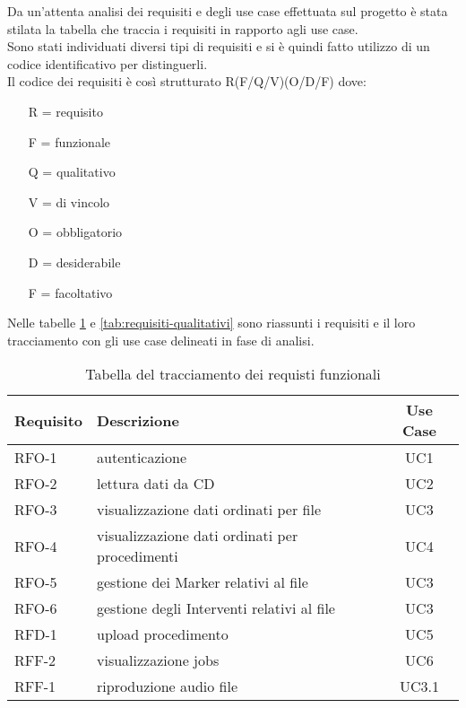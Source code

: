 Da un'attenta analisi dei requisiti e degli use case effettuata sul progetto è stata stilata la tabella che traccia i requisiti in rapporto agli use case.\\
Sono stati individuati diversi tipi di requisiti e si è quindi fatto utilizzo di un codice identificativo per distinguerli.\\
Il codice dei requisiti è così strutturato R(F/Q/V)(O/D/F) dove:
\begin{enumerate}
  \item[R =] requisito
  \item[F =] funzionale
  \item[Q =] qualitativo
  \item[V =] di vincolo
  \item[O =] obbligatorio
  \item[D =] desiderabile
  \item[F =] facoltativo
\end{enumerate}
Nelle tabelle \ref{tab:requisiti-funzionali} e \ref{tab:requisiti-qualitativi} sono riassunti i requisiti e il loro tracciamento con gli use case delineati in fase di analisi.
\newpage
\renewcommand{\arraystretch}{1.8} %
\begin{table}%
  \begin{tabularx}{\textwidth}{|l|X|c|}
    \hline
    \textbf{Requisito} & \textbf{Descrizione}                           & \textbf{Use Case} \\
    \hline
    RFO-1              & autenticazione                                 & UC1               \\
    \hline
    RFO-2              & lettura dati da CD                             & UC2               \\
    \hline
    RFO-3              & visualizzazione dati ordinati per file         & UC3               \\
    \hline
    RFO-4              & visualizzazione dati ordinati per procedimenti & UC4               \\
    \hline
    RFO-5              & gestione dei Marker relativi al file           & UC3               \\
    \hline
    RFO-6              & gestione degli Interventi relativi al file     & UC3               \\
    \hline
    RFD-1              & upload procedimento                            & UC5               \\
    \hline
    RFF-2              & visualizzazione jobs                           & UC6               \\
    \hline
    RFF-1              & riproduzione audio file                        & UC3.1             \\
    \hline
  \end{tabularx}
  \\
  \label{tab:requisiti-funzionali}
  \caption{Tabella del tracciamento dei requisti funzionali}
\end{table}%
